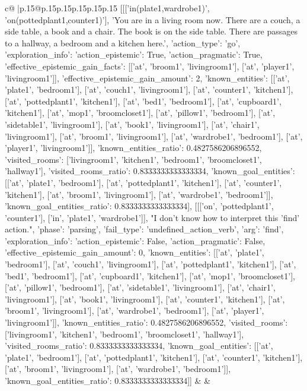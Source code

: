 \documentclass{article}
\begin{document}
{\begin{supertabular}{c@{$\;$}|p{.15\linewidth}@{}p{.15\linewidth}p{.15\linewidth}p{.15\linewidth}p{.15\linewidth}p{.15\linewidth}}
{{{	 [[['in(plate1,wardrobe1)', 'on(pottedplant1,counter1)'], 'You are in a living room now. There are a couch, a side table, a book and a chair. The book is on the side table. There are passages to a hallway, a bedroom and a kitchen here.', {'action_type': 'go', 'exploration_info': {'action_epistemic': True, 'action_pragmatic': True, 'effective_epistemic_gain_facts': [['at', 'broom1', 'livingroom1'], ['at', 'player1', 'livingroom1']], 'effective_epistemic_gain_amount': 2, 'known_entities': [['at', 'plate1', 'bedroom1'], ['at', 'couch1', 'livingroom1'], ['at', 'counter1', 'kitchen1'], ['at', 'pottedplant1', 'kitchen1'], ['at', 'bed1', 'bedroom1'], ['at', 'cupboard1', 'kitchen1'], ['at', 'mop1', 'broomcloset1'], ['at', 'pillow1', 'bedroom1'], ['at', 'sidetable1', 'livingroom1'], ['at', 'book1', 'livingroom1'], ['at', 'chair1', 'livingroom1'], ['at', 'broom1', 'livingroom1'], ['at', 'wardrobe1', 'bedroom1'], ['at', 'player1', 'livingroom1']], 'known_entities_ratio': 0.4827586206896552, 'visited_rooms': ['livingroom1', 'kitchen1', 'bedroom1', 'broomcloset1', 'hallway1'], 'visited_rooms_ratio': 0.8333333333333334, 'known_goal_entities': [['at', 'plate1', 'bedroom1'], ['at', 'pottedplant1', 'kitchen1'], ['at', 'counter1', 'kitchen1'], ['at', 'broom1', 'livingroom1'], ['at', 'wardrobe1', 'bedroom1']], 'known_goal_entities_ratio': 0.8333333333333334}}], [[['on', 'pottedplant1', 'counter1'], ['in', 'plate1', 'wardrobe1']], "I don't know how to interpret this 'find' action.", {'phase': 'parsing', 'fail_type': 'undefined_action_verb', 'arg': 'find', 'exploration_info': {'action_epistemic': False, 'action_pragmatic': False, 'effective_epistemic_gain_amount': 0, 'known_entities': [['at', 'plate1', 'bedroom1'], ['at', 'couch1', 'livingroom1'], ['at', 'pottedplant1', 'kitchen1'], ['at', 'bed1', 'bedroom1'], ['at', 'cupboard1', 'kitchen1'], ['at', 'mop1', 'broomcloset1'], ['at', 'pillow1', 'bedroom1'], ['at', 'sidetable1', 'livingroom1'], ['at', 'chair1', 'livingroom1'], ['at', 'book1', 'livingroom1'], ['at', 'counter1', 'kitchen1'], ['at', 'broom1', 'livingroom1'], ['at', 'wardrobe1', 'bedroom1'], ['at', 'player1', 'livingroom1']], 'known_entities_ratio': 0.4827586206896552, 'visited_rooms': ['livingroom1', 'kitchen1', 'bedroom1', 'broomcloset1', 'hallway1'], 'visited_rooms_ratio': 0.8333333333333334, 'known_goal_entities': [['at', 'plate1', 'bedroom1'], ['at', 'pottedplant1', 'kitchen1'], ['at', 'counter1', 'kitchen1'], ['at', 'broom1', 'livingroom1'], ['at', 'wardrobe1', 'bedroom1']], 'known_goal_entities_ratio': 0.8333333333333334}}]] 
	  } 
	   } 
	   } 
	 & & \\ 
 


\end{supertabular}}
\end{document}
